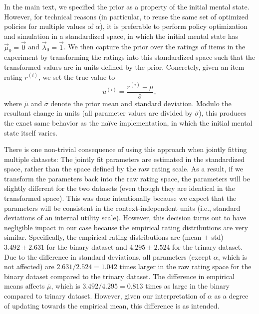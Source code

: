 In the main text, we specified the prior as a property of the initial mental state. However, for technical reasons (in particular, to reuse the same set of optimized policies for multiple values of $\alpha$), it is preferable to perform policy optimization and simulation in a standardized space, in which the initial mental state has $\vec{\mu}_0 = \vec{0}$ and $\vec{\lambda}_0 = \vec{1}$. We then capture the prior over the ratings of items in the experiment by transforming the ratings into this standardized space such that the transformed values are in units defined by the prior. Concretely, given an item rating $r^{(i)}$, we set the true value to
\begin{equation}\label{eq:rating-value}
  u^{(i)} = \frac{r^{(i)} - \bar{\mu}}{\bar{\sigma}},
\end{equation}
where $\bar{\mu}$ and $\bar{\sigma}$ denote the prior mean and standard deviation. 
Modulo the resultant change in units (all parameter values are divided by $\bar{\sigma}$), this produces the exact same behavior as the na\"ive implementation, in which the initial mental state itself varies. 

There is one non-trivial consequence of using this approach when jointly fitting multiple datasets: The jointly fit parameters are estimated in the standardized space, rather than the space defined by the raw rating scale. As a result, if we transform the parameters back into the raw rating space, the parameters will be slightly different for the two datasets (even though they are identical in the transformed space). This was done intentionally because we expect that the parameters will be consistent in the context-independent units (i.e., standard deviations of an internal utility scale). However, this decision turns out to have negligible impact in our case because the empirical rating distributions are very similar. Specifically, the empirical rating distributions are (mean $\pm$ std) $3.492 \pm 2.631$ for the binary dataset and $4.295 \pm 2.524$ for the trinary dataset. Due to the difference in standard deviations, all parameters (except $\alpha$, which is not affected) are $2.631 / 2.524 = 1.042$ times larger in the raw rating space for the binary dataset compared to the trinary dataset. The difference in empirical means affects $\bar{\mu}$, which is $3.492 / 4.295 = 0.813$ times as large in the binary compared to trinary dataset. However, given our interpretation of $\alpha$ as a degree of updating towards the empirical mean, this difference is as intended.

